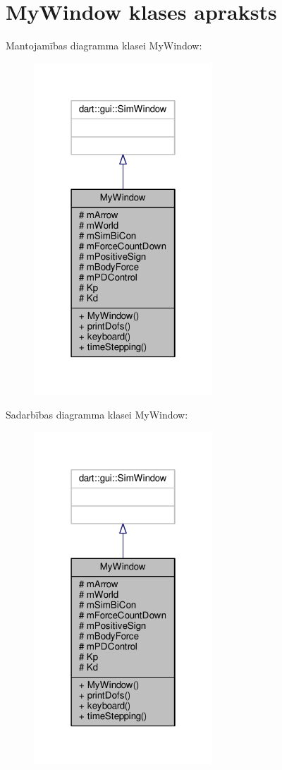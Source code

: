 \hypertarget{class_my_window}{}\section{My\+Window klases apraksts}
\label{class_my_window}


Mantojamības diagramma klasei My\+Window\+:
\nopagebreak
\begin{figure}[H]
\begin{center}
\leavevmode
\includegraphics[width=190pt]{class_my_window__inherit__graph}
\end{center}
\end{figure}


Sadarbības diagramma klasei My\+Window\+:
\nopagebreak
\begin{figure}[H]
\begin{center}
\leavevmode
\includegraphics[width=190pt]{class_my_window__coll__graph}
\end{center}
\end{figure}
